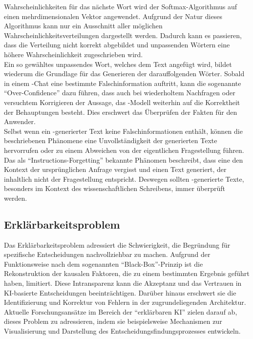 \documentclass[../main.tex]{subfiles}
\begin{document}
Wahrscheinlichkeiten für das nächste Wort wird der Softmax-Algorithmus auf einen mehrdimensionalen Vektor angewendet. Aufgrund der Natur dieses Algorithmus kann nur 
ein Ausschnitt aller möglichen Wahrscheinlichkeitsverteilungen dargestellt werden. Dadurch kann es passieren, dass die Verteilung nicht korrekt abgebildet und 
unpassenden Wörtern eine höhere Wahrscheinlichkeit zugeschrieben wird.\cite{softmax} \\
Ein so gewähltes unpassendes Wort, welches dem Text angefügt wird, bildet wiederum die Grundlage für das Generieren der darauffolgenden Wörter. Sobald in einem -Chat eine 
bestimmte Falschinformation auftritt, kann die sogenannte "`Over-Confidence"' dazu führen, dass auch bei wiederholtem Nachfragen oder versuchtem Korrigieren der 
Aussage, das -Modell weiterhin auf die Korrektheit der Behauptungen besteht. Dies erschwert das Überprüfen der Fakten für den Anwender.\cite{allgemHalluzinationen,softmax} \\
Selbst wenn ein -generierter Text keine Falschinformationen enthält, können die beschriebenen Phänomene eine Unvollständigkeit der generierten Texte hervorrufen 
oder zu einem Abweichen von der eigentlichen Fragestellung führen.  Das als "`Instructions-Forgetting"' bekannte Phänomen beschreibt, dass eine  den Kontext der 
ursprünglichen Anfrage vergisst und einen Text generiert, der inhaltlich nicht der Fragestellung entspricht. Deswegen sollten -generierte Texte, besonders im Kontext 
des wissenschaftlichen Schreibens, immer überprüft werden.\cite{allgemHalluzinationen}


\subsection{Erklärbarkeitsproblem}
\label{sec:erklärbarkeitsproblem}

Das Erklärbarkeitsproblem adressiert die Schwierigkeit, die Begründung für spezifische Entscheidungen  nachvollziehbar zu machen. Aufgrund der Funktionsweise nach dem sogenannten 
"`Black-Box"'-Prinzip ist die Rekonstruktion der kausalen Faktoren, die zu einem bestimmten Ergebnis geführt haben, limitiert. Diese Intransparenz kann die Akzeptanz und das Vertrauen in 
KI-basierte Entscheidungen beeinträchtigen. Darüber hinaus erschwert sie die Identifizierung und Korrektur von Fehlern in der zugrundeliegenden Architektur. Aktuelle Forschungsansätze 
im Bereich der "`erklärbaren KI"' zielen darauf ab, dieses Problem zu adressieren, indem sie beispielsweise Mechanismen zur Visualisierung und Darstellung des 
Entscheidungsfindungsprozesses entwickeln.
 
\end{document}
